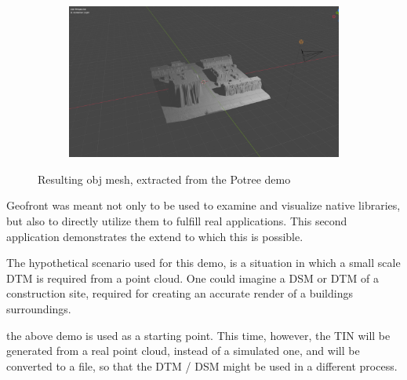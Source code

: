 \begin{figure}
  \begin{subfigure}[b]{0.90\linewidth}
    \centering
    \includegraphics[width=\linewidth]{potree-7.PNG}
  \end{subfigure}%
  \caption{Resulting obj mesh, extracted from the Potree demo}
  \label{fig:potree-result}
\end{figure}

Geofront was meant not only to be used to examine and visualize native libraries, but also to directly utilize them to fulfill real applications.
This second application demonstrates the extend to which this is possible. 

The hypothetical scenario used for this demo, is a situation in which a small scale DTM is required from a point cloud. 
One could imagine a DSM or DTM of a construction site, required for creating an accurate render of a buildings surroundings. 

the above  demo is used as a starting point. 
This time, however, the TIN will be generated from a real point cloud, instead of a simulated one, and will be converted to a  file, so that the DTM / DSM might be used in a different process. 

